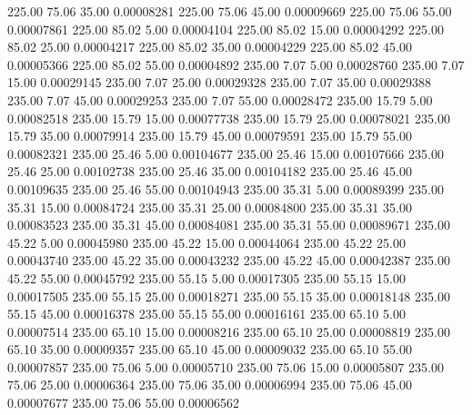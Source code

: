     225.00     75.06     35.00     0.00008281
    225.00     75.06     45.00     0.00009669
    225.00     75.06     55.00     0.00007861
    225.00     85.02      5.00     0.00004104
    225.00     85.02     15.00     0.00004292
    225.00     85.02     25.00     0.00004217
    225.00     85.02     35.00     0.00004229
    225.00     85.02     45.00     0.00005366
    225.00     85.02     55.00     0.00004892
    235.00      7.07      5.00     0.00028760
    235.00      7.07     15.00     0.00029145
    235.00      7.07     25.00     0.00029328
    235.00      7.07     35.00     0.00029388
    235.00      7.07     45.00     0.00029253
    235.00      7.07     55.00     0.00028472
    235.00     15.79      5.00     0.00082518
    235.00     15.79     15.00     0.00077738
    235.00     15.79     25.00     0.00078021
    235.00     15.79     35.00     0.00079914
    235.00     15.79     45.00     0.00079591
    235.00     15.79     55.00     0.00082321
    235.00     25.46      5.00     0.00104677
    235.00     25.46     15.00     0.00107666
    235.00     25.46     25.00     0.00102738
    235.00     25.46     35.00     0.00104182
    235.00     25.46     45.00     0.00109635
    235.00     25.46     55.00     0.00104943
    235.00     35.31      5.00     0.00089399
    235.00     35.31     15.00     0.00084724
    235.00     35.31     25.00     0.00084800
    235.00     35.31     35.00     0.00083523
    235.00     35.31     45.00     0.00084081
    235.00     35.31     55.00     0.00089671
    235.00     45.22      5.00     0.00045980
    235.00     45.22     15.00     0.00044064
    235.00     45.22     25.00     0.00043740
    235.00     45.22     35.00     0.00043232
    235.00     45.22     45.00     0.00042387
    235.00     45.22     55.00     0.00045792
    235.00     55.15      5.00     0.00017305
    235.00     55.15     15.00     0.00017505
    235.00     55.15     25.00     0.00018271
    235.00     55.15     35.00     0.00018148
    235.00     55.15     45.00     0.00016378
    235.00     55.15     55.00     0.00016161
    235.00     65.10      5.00     0.00007514
    235.00     65.10     15.00     0.00008216
    235.00     65.10     25.00     0.00008819
    235.00     65.10     35.00     0.00009357
    235.00     65.10     45.00     0.00009032
    235.00     65.10     55.00     0.00007857
    235.00     75.06      5.00     0.00005710
    235.00     75.06     15.00     0.00005807
    235.00     75.06     25.00     0.00006364
    235.00     75.06     35.00     0.00006994
    235.00     75.06     45.00     0.00007677
    235.00     75.06     55.00     0.00006562
